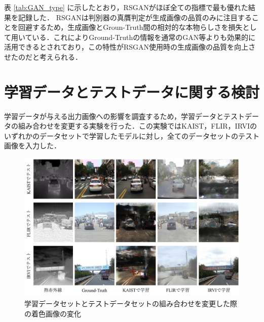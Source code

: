 \documentclass[11pt,dvipdfmx]{ujreport}
\begin{document}
\begin{table}[tb]
\centering
\caption{敵対的損失の計算方法による定量評価スコアの変化}
\label{tab:GAN_type}
\end{table}

表 \ref{tab:GAN_type} に示したとおり，RSGANがほぼ全ての指標で最も優れた結果を記録した．
RSGANは判別器の真贋判定が生成画像の品質のみに注目することを回避するため，生成画像とGroun-Truth間の相対的な本物らしさを損失として用いている．これによりGround-Truthの情報を通常のGAN等よりも効果的に活用できるとされており，この特性がRSGAN使用時の生成画像の品質を向上させたのだと考えられる．


\section{学習データとテストデータに関する検討}
学習データが与える出力画像への影響を調査するため，学習データとテストデータの組み合わせを変更する実験を行った．この実験ではKAIST，FLIR，IRVIのいずれかのデータセットで学習したモデルに対し，全てのデータセットのテスト画像を入力した．\par

\begin{figure}[tb]
    \centering
    \includegraphics[clip, width=1\columnwidth]{images/dataset_swap-jp_20240114.pdf}
    \caption{学習データセットとテストデータセットの組み合わせを変更した際の着色画像の変化}
    \label{fig:dataset_swap}
\end{figure}
\end{document}
